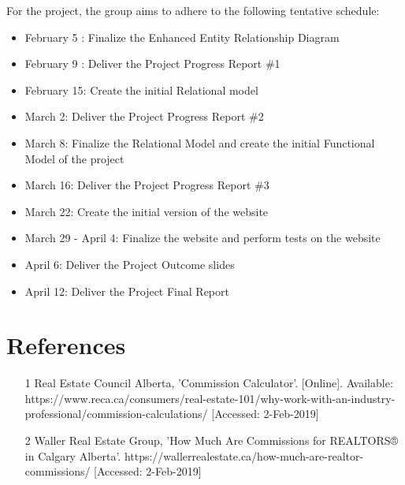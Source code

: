 \documentclass[letterpaper,12pt]{article}
\begin{document}
For the project, the group aims to adhere to the following tentative schedule:
\begin{itemize}
	\item February 5 : Finalize the Enhanced Entity Relationship Diagram
	\item February 9 : Deliver the Project Progress Report \#1
	\item February 15: Create the initial Relational model
	\item March 2: Deliver the Project Progress Report \#2
	\item March 8: Finalize the Relational Model and create the initial Functional Model of the project 
	\item March 16: Deliver the Project Progress Report \#3
	\item March 22: Create the initial version of the website
	\item March 29 - April 4: Finalize the website and perform tests on the website
	\item April 6: Deliver the Project Outcome slides
	\item April 12: Deliver the Project Final Report
\end{itemize}


\section{References}
\begin{itemize}
	\item [1] Real Estate Council Alberta, 'Commission Calculator'. [Online]. Available: https://www.reca.ca/consumers/real-estate-101/why-work-with-an-industry-professional/commission-calculations/ [Accessed: 2-Feb-2019]
	\item [2] Waller Real Estate Group, 'How Much Are Commissions for REALTORS® in Calgary Alberta'. https://wallerrealestate.ca/how-much-are-realtor-commissions/ [Accessed: 2-Feb-2019]
\end{itemize}
\end{document}

